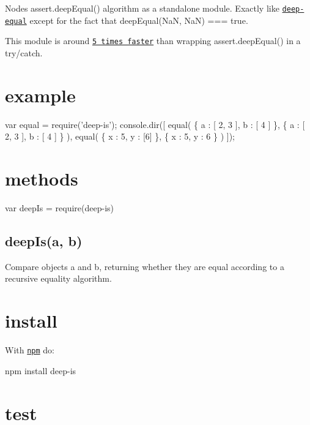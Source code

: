 Node\textquotesingle{}s {\ttfamily assert.\+deep\+Equal() algorithm} as a standalone module. Exactly like \href{https://github.com/substack/node-deep-equal}{\tt deep-\/equal} except for the fact that {\ttfamily deep\+Equal(\+Na\+N, Na\+N) === true}.

This module is around \href{https://gist.github.com/2790507}{\tt 5 times faster} than wrapping {\ttfamily assert.\+deep\+Equal()} in a {\ttfamily try/catch}.

\href{http://ci.testling.com/thlorenz/deep-is}{\tt }

\href{http://travis-ci.org/thlorenz/deep-is}{\tt }

\section*{example }


\begin{DoxyCode}
var equal = require('deep-is');
console.dir([
    equal(
        \{ a : [ 2, 3 ], b : [ 4 ] \},
        \{ a : [ 2, 3 ], b : [ 4 ] \}
    ),
    equal(
        \{ x : 5, y : [6] \},
        \{ x : 5, y : 6 \}
    )
]);
\end{DoxyCode}


\section*{methods }

var deep\+Is = require(\textquotesingle{}deep-\/is\textquotesingle{})

\subsection*{deep\+Is(a, b) }

Compare objects {\ttfamily a} and {\ttfamily b}, returning whether they are equal according to a recursive equality algorithm.

\section*{install }

With \href{http://npmjs.org}{\tt npm} do\+:


\begin{DoxyCode}
npm install deep-is
\end{DoxyCode}


\section*{test }


